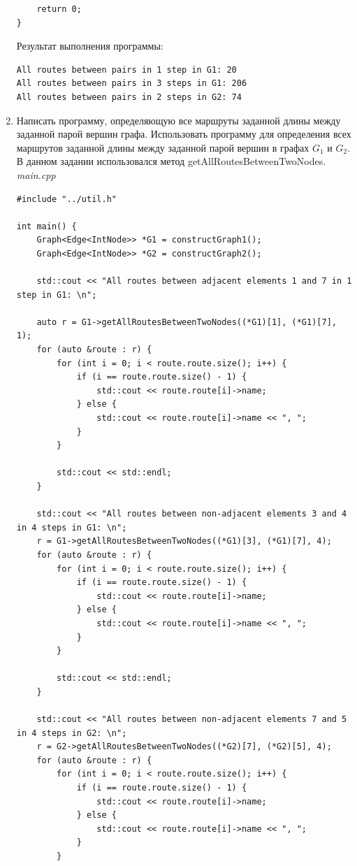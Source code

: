 \documentclass[a4paper,14pt]{extarticle}
\begin{document}
\begin{enumerate}[1.]
\begin{verbatim}
    return 0;
}
        \end{verbatim}
        Результат выполнения программы:
        \begin{verbatim}
All routes between pairs in 1 step in G1: 20
All routes between pairs in 3 steps in G1: 206
All routes between pairs in 2 steps in G2: 74
        \end{verbatim}


        \item Написать программу, определяющую все маршруты заданной
        длины между заданной парой вершин графа. Использовать программу
        для определения всех маршрутов заданной длины между заданной 
        парой вершин в графах $G_1$ и $G_2$.\\
        В данном задании использовался метод getAllRoutesBetweenTwoNodes.\\
        \textit{main.cpp}
        \begin{verbatim}
#include "../util.h"

int main() {
    Graph<Edge<IntNode>> *G1 = constructGraph1();
    Graph<Edge<IntNode>> *G2 = constructGraph2();

    std::cout << "All routes between adjacent elements 1 and 7 in 1 step in G1: \n";
    
    auto r = G1->getAllRoutesBetweenTwoNodes((*G1)[1], (*G1)[7], 1);
    for (auto &route : r) {
        for (int i = 0; i < route.route.size(); i++) {
            if (i == route.route.size() - 1) {
                std::cout << route.route[i]->name;
            } else {
                std::cout << route.route[i]->name << ", ";
            }
        }

        std::cout << std::endl;
    }

    std::cout << "All routes between non-adjacent elements 3 and 4 in 4 steps in G1: \n";
    r = G1->getAllRoutesBetweenTwoNodes((*G1)[3], (*G1)[7], 4);
    for (auto &route : r) {
        for (int i = 0; i < route.route.size(); i++) {
            if (i == route.route.size() - 1) {
                std::cout << route.route[i]->name;
            } else {
                std::cout << route.route[i]->name << ", ";
            }
        }

        std::cout << std::endl;
    }

    std::cout << "All routes between non-adjacent elements 7 and 5 in 4 steps in G2: \n";
    r = G2->getAllRoutesBetweenTwoNodes((*G2)[7], (*G2)[5], 4);
    for (auto &route : r) {
        for (int i = 0; i < route.route.size(); i++) {
            if (i == route.route.size() - 1) {
                std::cout << route.route[i]->name;
            } else {
                std::cout << route.route[i]->name << ", ";
            }
        }


\end{verbatim}
\end{enumerate}
\end{document}
